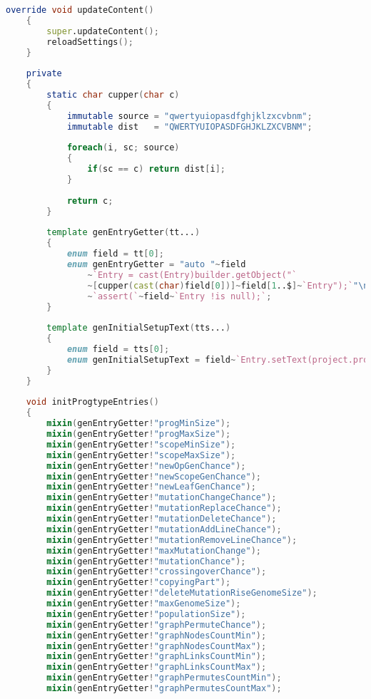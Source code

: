 \documentclass[russian,utf8,emptystyle]{eskdtext}
\begin{document}
\begin{lstlisting}[language=D]
    override void updateContent()
    {
        super.updateContent();
        reloadSettings();
    }
    
    private
    {
        static char cupper(char c)
        {
            immutable source = "qwertyuiopasdfghjklzxcvbnm";
            immutable dist   = "QWERTYUIOPASDFGHJKLZXCVBNM";
            
            foreach(i, sc; source)
            {
                if(sc == c) return dist[i];
            }
            
            return c;
        }
        
        template genEntryGetter(tt...)
        {
            enum field = tt[0];
            enum genEntryGetter = "auto "~field
                ~`Entry = cast(Entry)builder.getObject("`
                ~[cupper(cast(char)field[0])]~field[1..$]~`Entry");`"\n"
                ~`assert(`~field~`Entry !is null);`;
        }
        
        template genInitialSetupText(tts...)
        {
            enum field = tts[0];
            enum genInitialSetupText = field~`Entry.setText(project.programType.`~field~`.to!string);`;
        }
    }
    
    void initProgtypeEntries()
    {
        mixin(genEntryGetter!"progMinSize");
        mixin(genEntryGetter!"progMaxSize");
        mixin(genEntryGetter!"scopeMinSize");
        mixin(genEntryGetter!"scopeMaxSize");
        mixin(genEntryGetter!"newOpGenChance");
        mixin(genEntryGetter!"newScopeGenChance");
        mixin(genEntryGetter!"newLeafGenChance");
        mixin(genEntryGetter!"mutationChangeChance");
        mixin(genEntryGetter!"mutationReplaceChance");
        mixin(genEntryGetter!"mutationDeleteChance");
        mixin(genEntryGetter!"mutationAddLineChance");
        mixin(genEntryGetter!"mutationRemoveLineChance");
        mixin(genEntryGetter!"maxMutationChange");
        mixin(genEntryGetter!"mutationChance");
        mixin(genEntryGetter!"crossingoverChance");
        mixin(genEntryGetter!"copyingPart");
        mixin(genEntryGetter!"deleteMutationRiseGenomeSize");
        mixin(genEntryGetter!"maxGenomeSize");
        mixin(genEntryGetter!"populationSize");
        mixin(genEntryGetter!"graphPermuteChance");
        mixin(genEntryGetter!"graphNodesCountMin");
        mixin(genEntryGetter!"graphNodesCountMax");
        mixin(genEntryGetter!"graphLinksCountMin");
        mixin(genEntryGetter!"graphLinksCountMax");
        mixin(genEntryGetter!"graphPermutesCountMin");
        mixin(genEntryGetter!"graphPermutesCountMax");
        

\end{lstlisting}
\end{document}
